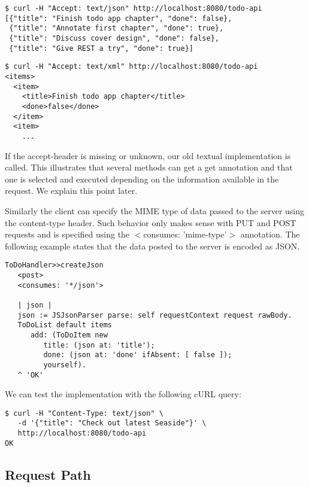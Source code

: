\documentclass[a4paper,10pt,twoside]{book}
\newcommand{\ct}[1]{{\small\ttfamily\textup{#1}}}
\begin{document}
\begin{lstlisting}
$ curl -H "Accept: text/json" http://localhost:8080/todo-api
[{"title": "Finish todo app chapter", "done": false},
 {"title": "Annotate first chapter", "done": true},
 {"title": "Discuss cover design", "done": false},
 {"title": "Give REST a try", "done": true}]
\end{lstlisting}

\begin{lstlisting}
$ curl -H "Accept: text/xml" http://localhost:8080/todo-api
<items>
  <item>
    <title>Finish todo app chapter</title>
    <done>false</done>
  </item>
  <item>
    ... 
\end{lstlisting}

If the accept-header is missing or unknown, our old textual implementation is called. This illustrates that several methods can get a get annotation and that one is selected and executed depending on the information available in the request. We explain this point later. 

 Similarly the client can specify the MIME type of data passed to the server using the content-type header. Such behavior only makes sense with PUT and POST requests and is specified using the \ct{$<$consumes: 'mime-type'$>$} annotation. The following example states that the data posted to the server is encoded as JSON.

\begin{lstlisting}
ToDoHandler>>createJson
   <post>
   <consumes: '*/json'>

   | json |
   json := JSJsonParser parse: self requestContext request rawBody.
   ToDoList default items
      add: (ToDoItem new
         title: (json at: 'title');
         done: (json at: 'done' ifAbsent: [ false ]);
         yourself).
   ^ 'OK'
\end{lstlisting}

We can test the implementation with the following cURL query:

\begin{lstlisting}
$ curl -H "Content-Type: text/json" \
   -d '{"title": "Check out latest Seaside"}' \
   http://localhost:8080/todo-api
OK
\end{lstlisting}

\subsection{Request Path}
\label{book:advanced:restful:matching:requestpath}
\end{document}
